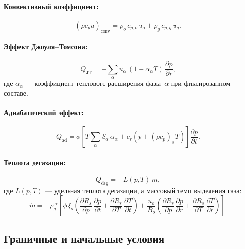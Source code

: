 \documentclass[12pt,a4paper]{article}
\newcommand{\pp}{\partial}
\newcommand{\st}{\text{ст}}
\begin{document}
\paragraph{Конвективный коэффициент:}
\begin{equation}\label{eq:rhocp_conv}
  (\rho c_p u)_\mathrm{conv}
  = \rho_o\,c_{p,o}\,u_o + \rho_g\,c_{p,g}\,u_g.
\end{equation}

\paragraph{Эффект Джоуля--Томсона:}
\begin{equation}\label{eq:QJT}
  Q_\mathrm{JT} = -\sum_\alpha u_\alpha\,(1 - \alpha_\alpha T)\,
    \frac{\pp p}{\pp r},
\end{equation}
где $\alpha_\alpha$ --- коэффициент теплового расширения
фазы~$\alpha$ при фиксированном составе.

\paragraph{Адиабатический эффект:}
\begin{equation}\label{eq:Qad}
  Q_\mathrm{ad} = \phi\!\left[
    T\sum_\alpha S_\alpha\,\alpha_\alpha
    + c_r\!\left(p + (\rho c_p)_s\,T\right)
  \right]\frac{\pp p}{\pp t}.
\end{equation}

\paragraph{Теплота дегазации:}
\begin{equation}\label{eq:Qdeg}
  Q_\mathrm{deg} = -L(p,T)\,\dot{m},
\end{equation}
где $L(p,T)$ --- удельная теплота дегазации, а массовый темп
выделения газа:
\begin{equation}\label{eq:mdot}
  \dot{m} = -\rho_g^\st\!\left[
    \phi\,\xi_o\!\left(
      \frac{\pp R_s}{\pp p}\,\frac{\pp p}{\pp t}
      + \frac{\pp R_s}{\pp T}\,\frac{\pp T}{\pp t}
    \right)
    + \frac{u_o}{B_o}\!\left(
      \frac{\pp R_s}{\pp p}\,\frac{\pp p}{\pp r}
      + \frac{\pp R_s}{\pp T}\,\frac{\pp T}{\pp r}
    \right)
  \right].
\end{equation}


\subsection{Граничные и начальные условия}
\end{document}
